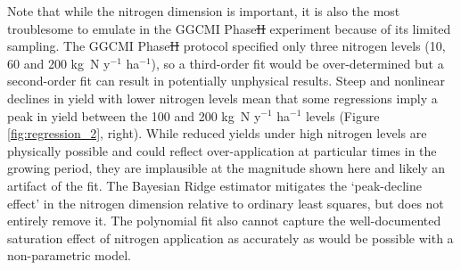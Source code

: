 \documentclass[gmdd]{copernicus} %
\providecommand{\DIFadd}[1]{{\protect\color{blue}\uwave{#1}}} %
\providecommand{\DIFdel}[1]{{\protect\color{red}\sout{#1}}}                      %
\providecommand{\DIFaddbegin}{} %
\providecommand{\DIFaddend}{} %
\providecommand{\DIFdelbegin}{} %
\providecommand{\DIFdelend}{} %
\begin{document}
Note that while the nitrogen dimension is important, it is also the most troublesome to emulate in the GGCMI Phase\DIFdelbegin \DIFdel{II }\DIFdelend \DIFaddbegin \DIFadd{~2 }\DIFaddend experiment because of its limited sampling. 
The GGCMI Phase\DIFdelbegin \DIFdel{II }\DIFdelend \DIFaddbegin \DIFadd{~2 }\DIFaddend protocol specified only three nitrogen levels (10, 60 and 200 kg~N y$^{-1}$ ha$^{-1}$), so a third-order fit would be over-determined but a second-order fit can result in potentially unphysical results. 
Steep and nonlinear declines in yield with lower nitrogen levels mean that some regressions imply a peak in yield between the 100 and 200 kg~N y$^{-1}$ ha$^{-1}$ levels (Figure \ref{fig:regression_2}, right). 
While reduced yields under high nitrogen levels are physically possible and could reflect over-application at particular times in the growing period, they are implausible at the magnitude shown here and likely an artifact of the fit. 
The Bayesian Ridge estimator mitigates the `peak-decline effect' in the nitrogen dimension relative to ordinary least squares, but does not entirely remove it. 
The polynomial fit also cannot capture the well-documented saturation effect of nitrogen application \citep[e.g.][]{Torsten77} as accurately as would be possible with a non-parametric model. 
\end{document}

